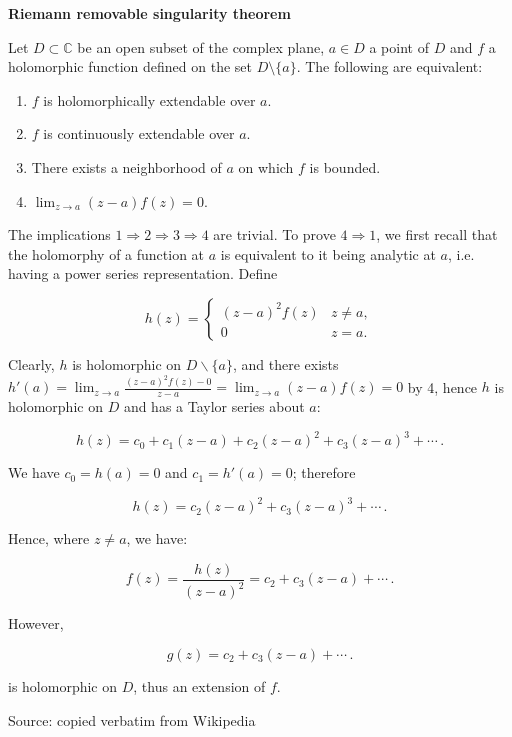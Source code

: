 \begin{mdframed}[backgroundcolor=yellow!20]
\begin{center}
{\bf Riemann removable singularity theorem}
\end{center}
\theorem
\label{Riemann removable singularity theorem}
Let $D \subset \mathbb{C}$ be an open subset of the complex plane,
$a \in D$ a point of $D$ and $f$ a holomorphic function defined on
the set $D \setminus \{a\}$.  The following are equivalent:

\begin{enumerate}
\item $f$ is holomorphically extendable over $a$.
\item $f$ is continuously extendable over $a$.
\item There exists a neighborhood of $a$ on which $f$ is bounded.
\item $\lim_{z\to a}(z - a) f(z) = 0$.
\end{enumerate}

\proof

The implications $1 \Rightarrow 2 \Rightarrow 3 \Rightarrow 4$ are
trivial. To prove $4 \Rightarrow 1$, we first recall that the
holomorphy of a function at $a$ is equivalent to it being analytic at
$a$, i.e. having a power series representation. Define

$$
h(z) = \left\{
\begin{array}{rl}
(z - a)^2 f(z) &  z \ne a ,\\
0              &  z = a .
\end{array} \right.
$$

Clearly, $h$ is holomorphic on $D\backslash\{a\}$, and there exists
$h'(a)=\lim_{z\to a}\frac{(z - a)^2f(z)-0}{z-a}=\lim_{z\to a}(z - a) f(z)=0$
by 4, hence $h$ is holomorphic on $D$ and has a Taylor series about $a$:

$$h(z) = c_0 + c_1(z-a) + c_2 (z - a)^2 + c_3 (z - a)^3 + \cdots \, .$$

We have $c_0 = h(a) = 0$ and $c_1 = h'(a) = 0$; therefore

$$h(z) = c_2 (z - a)^2 + c_3 (z - a)^3 + \cdots \, .$$

Hence, where $z \ne a$, we have:

$$f(z) = \frac{h(z)}{(z - a)^2} = c_2 + c_3 (z - a) + \cdots \, .$$

However,

$$g(z) = c_2 + c_3 (z - a) + \cdots \, .$$

is holomorphic on $D$, thus an extension of $f$.

\endtheorem
Source: copied verbatim from Wikipedia
\end{mdframed}

